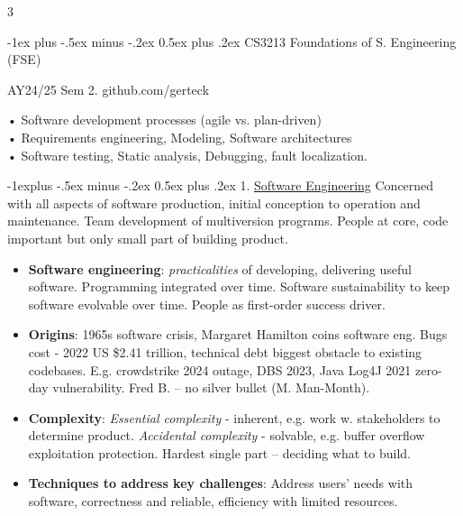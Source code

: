 \documentclass[a4paper, 10pt, landscape]{article}
\makeatletter
\renewcommand{\section}{\@startsection{section}{1}{0mm}%
                                {-1ex plus -.5ex minus -.2ex}%
                                {0.5ex plus .2ex}%
                                {\normalfont\large\bfseries}}
\renewcommand{\subsection}{\@startsection{subsection}{2}{0mm}%
                                {-1explus -.5ex minus -.2ex}%
                                {0.5ex plus .2ex}%
                                {\normalfont\normalsize\bfseries}}
\makeatother
\begin{document}
\raggedright
\footnotesize
\begin{multicols*}{3}

\setlength{\columnseprule}{0pt}
\setlength{\premulticols}{1pt}
\setlength{\postmulticols}{1pt}
\setlength{\multicolsep}{2pt}
\setlength{\columnsep}{2pt}

\section{CS3213 Foundations of S. Engineering (FSE)}
\centerline{AY24/25 Sem 2. github.com/gerteck}
• Software development processes (agile vs. plan-driven) \\
• Requirements engineering, Modeling, Software architectures \\ 
• Software testing, Static analysis, Debugging, fault localization. 

\subsection{1. \underline{Software Engineering}}
Concerned with all aspects of software production, initial conception to operation and maintenance. Team development of multiversion programs. People at core, code important but only small part of building product.
\begin{itemize}
\item \textbf{Software engineering}: \textit{practicalities} of developing, delivering useful software. Programming integrated over time. Software sustainability to keep software evolvable over time. People as first-order success driver.
\item \textbf{Origins}: 1965s software crisis, Margaret Hamilton coins software eng. Bugs cost - 2022 US \$2.41 trillion, technical debt biggest obstacle to existing codebases. E.g. crowdstrike 2024 outage, DBS 2023, Java Log4J 2021 zero-day vulnerability. Fred B. -- no silver bullet (M. Man-Month). 
\item \textbf{Complexity}: \textit{Essential complexity} - inherent, e.g. work w. stakeholders to determine product. \textit{Accidental complexity} - solvable, e.g. buffer overflow exploitation protection. Hardest single part -- deciding what to build. 
\item \textbf{Techniques to address key challenges}: Address users' needs with software, correctness and reliable, efficiency with limited resources.
\end{itemize}


\end{multicols*}
\end{document}
